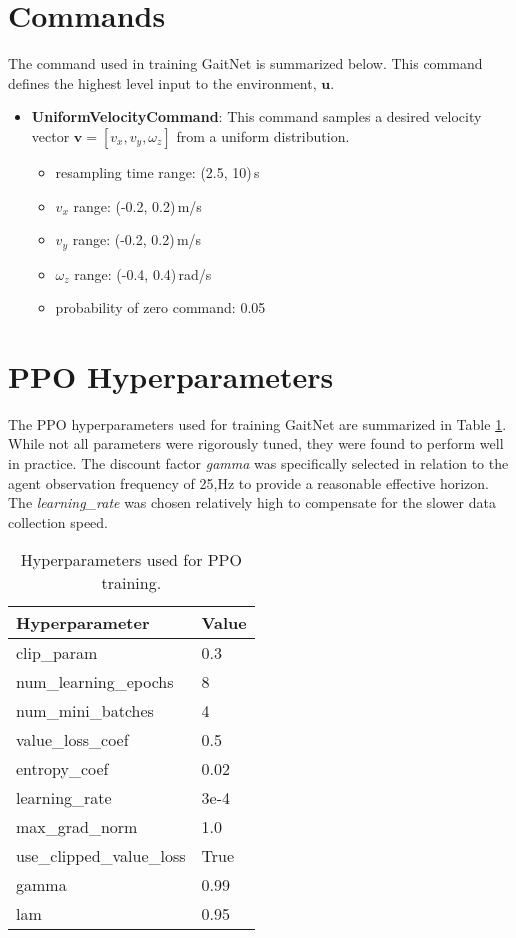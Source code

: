 \section{Commands}
\label{sec:appendix-commands}

The command used in training GaitNet is summarized below. This
command defines the highest level input to the environment, $\mathbf u$.

\begin{itemize}
  \item \textbf{UniformVelocityCommand}: This command samples a desired
    velocity vector $\mathbf{v} = [v_x, v_y, \omega_z]$ from a
    uniform   distribution.
    \begin{itemize}
      \item resampling time range: (2.5, 10)\,s
      \item $v_x$ range: (-0.2, 0.2)\,m/s
      \item $v_y$ range: (-0.2, 0.2)\,m/s
      \item $\omega_z$ range: (-0.4, 0.4)\,rad/s
      \item probability of zero command: 0.05
    \end{itemize}
\end{itemize}

\section{PPO Hyperparameters}
\label{sec:appendix-ppo-hyperparameters}

The PPO hyperparameters used for training GaitNet are summarized in
Table \ref{tab:ppo-hyperparams}. While not all parameters were
rigorously tuned, they were found to perform well in practice. The
discount factor \textit{gamma} was specifically selected in relation
to the agent observation frequency of 25,Hz to provide a reasonable
effective horizon. The \textit{learning\_rate} was chosen relatively
high to compensate for the slower data collection speed.

\begin{table}[h!]
  \centering
  \begin{tabular}{ll}
    \hline
    \textbf{Hyperparameter} & \textbf{Value} \\
    \hline
    clip\_param & 0.3 \\     num\_learning\_epochs & 8 \\
    num\_mini\_batches & 4 \\     value\_loss\_coef & 0.5 \\
    entropy\_coef & 0.02 \\     learning\_rate & 3e-4 \\
    max\_grad\_norm & 1.0 \\     use\_clipped\_value\_loss & True \\
    gamma & 0.99 \\     lam & 0.95 \\
    \hline
  \end{tabular}
  \caption{Hyperparameters used for PPO training.}
  \label{tab:ppo-hyperparams}
\end{table}
